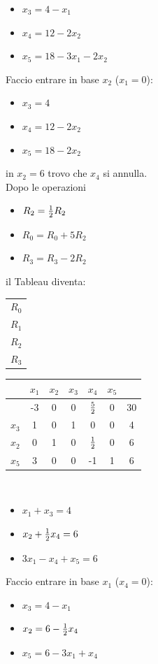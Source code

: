 \documentclass[12pt,a4paper]{article}
\begin{document}
\begin{itemize}
\item $x_3=4-x_1$
\item $x_4 = 12 - 2x_2$
\item $x_5 = 18 - 3x_1-2x_2$
\end{itemize}
Faccio entrare in base $x_2$ ($x_1=0$):
\begin{itemize}
\item $x_3=4$
\item $x_4 = 12 - 2x_2$
\item $x_5 = 18 -2x_2$
\end{itemize}
in $x_2=6$ trovo che $x_4$ si annulla.\\
Dopo le operazioni \begin{itemize}
\item $R_2 = {1\over 2}R_2$
\item $R_0 = R_0 + 5R_2$
\item $R_3 = R_3 - 2R_2$
\end{itemize} il Tableau diventa:
\begin{center}
\begin{tabular}{c}
\\
$R_0$\\
$R_1$\\
$R_2$\\
$R_3$\\
\end{tabular}
\begin{tabular}{r|ccccc|c|}
& $x_1$ & $x_2$ & $x_3$ & $x_4$ & $x_5$\\
 \hline
& -3 & 0 & 0 & ${5\over2}$ & 0 & 30\\
$x_3$ & 1 & 0 & 1 & 0 & 0 & 4\\
$x_2$ & 0 & 1 & 0 & ${1\over2}$ & 0 & 6\\
$x_5$ & 3 & 0 & 0 & -1 & 1 & 6\\
\end{tabular}\\
\end{center}
\begin{itemize}
\item $x_1+x_3=4$
\item $x_2+{1\over2}x_4 = 6$
\item $3x_1-x_4+x_5=6$
\end{itemize}
Faccio entrare in base $x_1$ ($x_4=0$):
\begin{itemize}
\item $x_3= 4-x_1$
\item $x_2 = 6 - {1\over 2}x_4$
\item $x_5 = 6 -3x_1+x_4$
\end{itemize}
\end{document}
